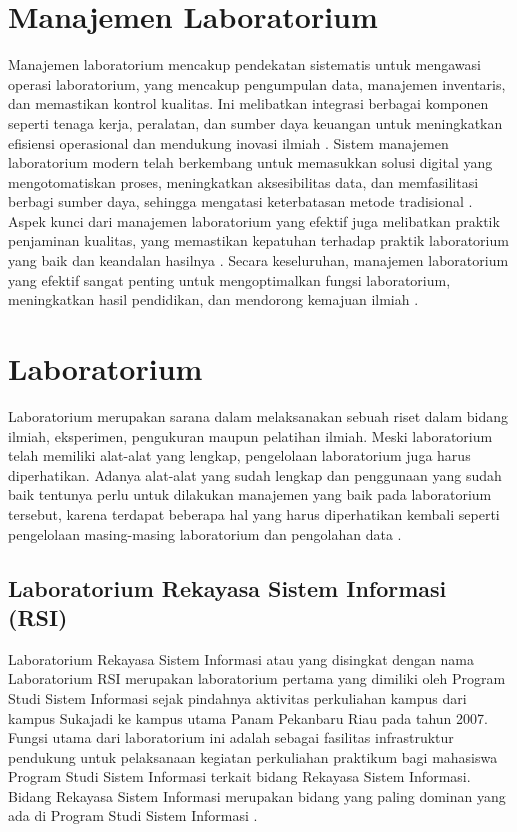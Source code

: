 \section{Manajemen Laboratorium}
Manajemen laboratorium mencakup pendekatan sistematis untuk mengawasi operasi laboratorium, yang mencakup pengumpulan data, manajemen inventaris, dan memastikan kontrol kualitas. Ini melibatkan integrasi berbagai komponen seperti tenaga kerja, peralatan, dan sumber daya keuangan untuk meningkatkan efisiensi operasional dan mendukung inovasi ilmiah \cite{marwah2024sistem}. Sistem manajemen laboratorium modern telah berkembang untuk memasukkan solusi digital yang mengotomatiskan proses, meningkatkan aksesibilitas data, dan memfasilitasi berbagi sumber daya, sehingga mengatasi keterbatasan metode tradisional \cite{rihm2024digital}. Aspek kunci dari manajemen laboratorium yang efektif juga melibatkan praktik penjaminan kualitas, yang memastikan kepatuhan terhadap praktik laboratorium yang baik dan keandalan hasilnya \cite{kawai2021phase}. Secara keseluruhan, manajemen laboratorium yang efektif sangat penting untuk mengoptimalkan fungsi laboratorium, meningkatkan hasil pendidikan, dan mendorong kemajuan ilmiah \cite{marwah2024sistem}.

\section{Laboratorium}
Laboratorium merupakan sarana dalam melaksanakan sebuah riset dalam bidang ilmiah, eksperimen, pengukuran maupun pelatihan ilmiah. Meski laboratorium telah memiliki alat-alat yang lengkap, pengelolaan laboratorium juga harus diperhatikan. Adanya alat-alat yang sudah lengkap dan penggunaan yang sudah baik tentunya perlu untuk dilakukan manajemen yang baik pada laboratorium tersebut, karena terdapat beberapa hal yang harus diperhatikan kembali seperti pengelolaan masing-masing laboratorium dan pengolahan data \cite{sweden2022rancang}.

\subsection{Laboratorium Rekayasa Sistem Informasi (RSI)}
Laboratorium Rekayasa Sistem Informasi atau yang disingkat dengan nama Laboratorium RSI merupakan laboratorium pertama yang dimiliki oleh Program Studi Sistem Informasi sejak pindahnya aktivitas perkuliahan kampus dari kampus Sukajadi ke kampus utama Panam Pekanbaru Riau pada tahun 2007. Fungsi utama dari laboratorium ini adalah sebagai fasilitas infrastruktur pendukung untuk pelaksanaan kegiatan perkuliahan praktikum bagi mahasiswa Program Studi Sistem Informasi terkait bidang Rekayasa Sistem Informasi. Bidang Rekayasa Sistem Informasi merupakan bidang yang paling dominan yang ada di Program Studi Sistem Informasi \cite{lab-si-website}.

